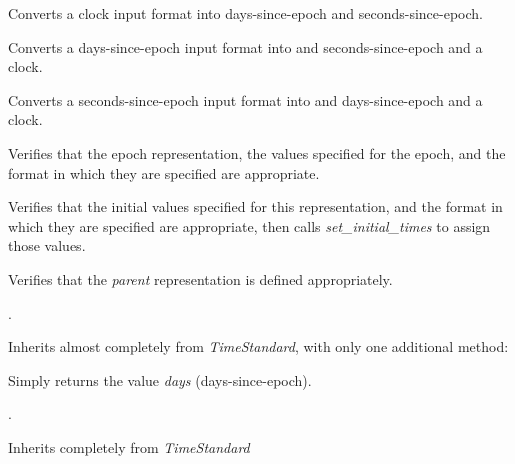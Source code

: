 {\begin{enumerate}
{\begin{enumerate}
Converts a clock input format into days-since-epoch and
seconds-since-epoch.




Converts a days-since-epoch input format into and seconds-since-epoch
and a clock.

Converts a seconds-since-epoch input format into and days-since-epoch
and a clock.

Verifies that the epoch representation, the values specified for the
epoch, and the format in which they are specified are appropriate.

Verifies that the initial values specified for this representation, and
the format in which they are specified are appropriate, then calls
\textit{set\_initial\_times} to assign those values.

Verifies that the \textit{parent} representation is defined
appropriately.

\end{enumerate}}



  .


Inherits almost completely from \textit{TimeStandard}, with only one
additional method:

{\begin{enumerate}
Simply returns the value \textit{days} (days-since-epoch).
\end{enumerate}}


  .

Inherits completely from \textit{TimeStandard}


\end{enumerate}}

